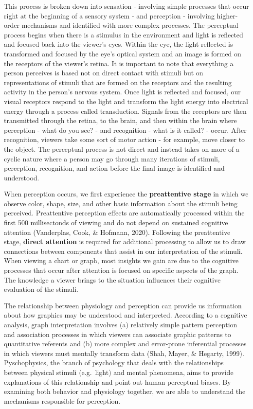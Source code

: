 \documentclass[print]{nuthesis}
\begin{document}
This process is broken down into sensation - involving simple processes that occur right at the beginning of a sensory system - and perception - involving higher-order mechanisms and identified with more complex processes.
The perceptual process begins when there is a stimulus in the environment and light is reflected and focused back into the viewer's eyes.
Within the eye, the light reflected is transformed and focused by the eye's optical system and an image is formed on the receptors of the viewer's retina.
It is important to note that everything a person perceives is based not on direct contact with stimuli but on representations of stimuli that are formed on the receptors and the resulting activity in the person's nervous system.
Once light is reflected and focused, our visual receptors respond to the light and transform the light energy into electrical energy through a process called transduction.
Signals from the receptors are then transmitted through the retina, to the brain, and then within the brain where perception - what do you see? - and recognition - what is it called? - occur.
After recognition, viewers take some sort of motor action - for example, move closer to the object.
The perceptual process is not direct and instead takes on more of a cyclic nature where a person may go through many iterations of stimuli, perception, recognition, and action before the final image is identified and understood.

When perception occurs, we first experience the \textbf{preattentive stage} in which we observe color, shape, size, and other basic information about the stimuli being perceived. Preattentive perception effects are automatically processed within the first 500 millisectonds of viewing and do not depend on sustained cognitive attention (Vanderplas, Cook, \& Hofmann, 2020).
Following the preattentive stage, \textbf{direct attention} is required for additional processing to allow us to draw connections between components that assist in our interpretation of the stimuli.
When viewing a chart or graph, most insights we gain are due to the cognitive processes that occur after attention is focused on specific aspects of the graph.
The knowledge a viewer brings to the situation influences their cognitive evaluation of the stimuli. 

The relationship between physiology and perception can provide us information about how graphics may be understood and interpreted.
According to a cognitive analysis, graph interpretation involves (a) relatively simple pattern perception and association processes in which viewers can associate graphic patterns to quantitative referents and (b) more complex and error-prone inferential processes in which viewers must mentally transform data (Shah, Mayer, \& Hegarty, 1999).
Pyschophysics, the branch of psychology that deals with the relationships between physical stimuli (e.g.~light) and mental phenomena, aims to provide explanations of this relationship and point out human perceptual biases.
By examining both behavior and physiology together, we are able to understand the mechanisms responsible for perception.
\end{document}
